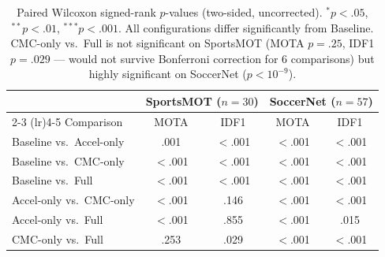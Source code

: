 \begin{table}[t]
  \centering
  \small
  \begin{tabular}{lcccc}
    \toprule
    & \multicolumn{2}{c}{SportsMOT ($n{=}30$)}
    & \multicolumn{2}{c}{SoccerNet ($n{=}57$)} \\
    \cmidrule(lr){2-3} \cmidrule(lr){4-5}
    Comparison & MOTA & IDF1 & MOTA & IDF1 \\
    \midrule
    Baseline vs.\ Accel-only
      & .001\rlap{$^{**}$}  & $<$.001\rlap{$^{***}$}
      & $<$.001\rlap{$^{***}$} & $<$.001\rlap{$^{***}$} \\
    Baseline vs.\ CMC-only
      & $<$.001\rlap{$^{***}$} & $<$.001\rlap{$^{***}$}
      & $<$.001\rlap{$^{***}$} & $<$.001\rlap{$^{***}$} \\
    Baseline vs.\ Full
      & $<$.001\rlap{$^{***}$} & $<$.001\rlap{$^{***}$}
      & $<$.001\rlap{$^{***}$} & $<$.001\rlap{$^{***}$} \\
    Accel-only vs.\ CMC-only
      & $<$.001\rlap{$^{***}$} & .146\phantom{$^{***}$}
      & $<$.001\rlap{$^{***}$} & $<$.001\rlap{$^{***}$} \\
    Accel-only vs.\ Full
      & $<$.001\rlap{$^{***}$} & .855\phantom{$^{***}$}
      & $<$.001\rlap{$^{***}$} & .015\rlap{$^{*}$}\phantom{$^{**}$} \\
    CMC-only vs.\ Full
      & .253\phantom{$^{***}$} & .029\phantom{$^{***}$}
      & $<$.001\rlap{$^{***}$} & $<$.001\rlap{$^{***}$} \\
    \bottomrule
  \end{tabular}
  \caption{Paired Wilcoxon signed-rank $p$-values (two-sided, uncorrected).
  $^{*}\!p<.05$,\; $^{**}\!p<.01$,\; $^{***}\!p<.001$.
  All configurations differ significantly from Baseline.
  CMC-only vs.\ Full is not significant on SportsMOT (MOTA $p{=}.25$,
  IDF1 $p{=}.029$ --- would not survive Bonferroni correction for 6
  comparisons) but highly significant on SoccerNet ($p < 10^{-9}$).}
  \label{tab:significance}
\end{table}

